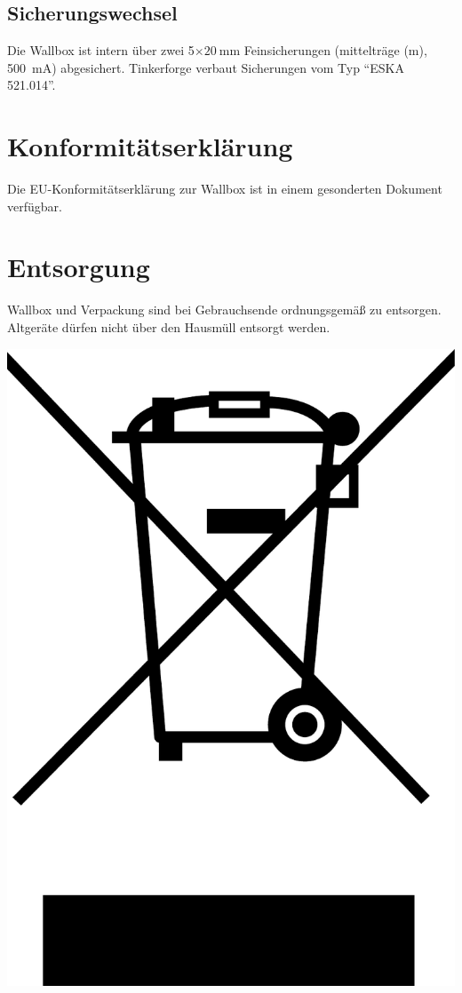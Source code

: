 \documentclass[a4paper,10pt]{article}
\begin{document}
\begin{multicols*}{2}
	\subsection{Sicherungswechsel}
	Die Wallbox ist intern über zwei 5$\times\SI{20}{\milli\meter}$ Feinsicherungen (mittelträge (m), \SI{500}{\milli\ampere}) abgesichert.
	Tinkerforge verbaut Sicherungen vom Typ \enquote{ESKA 521.014}.

	\section{Konformitätserklärung}
	Die EU-Konformitätserklärung zur Wallbox ist in einem gesonderten Dokument verfügbar.

	\section{Entsorgung}
	\begin{minipage}{0.41\textwidth}
		Wallbox und Verpackung sind bei Gebrauchsende ordnungsgemäß zu
		entsorgen. Altgeräte dürfen nicht über den Hausmüll entsorgt werden.
	\end{minipage}\hfill
	\begin{minipage}{0.07\textwidth}
		\includegraphics[width=\linewidth]{./img_warp2/resized/weee.pdf}
	\end{minipage}


\end{multicols*}
\end{document}
